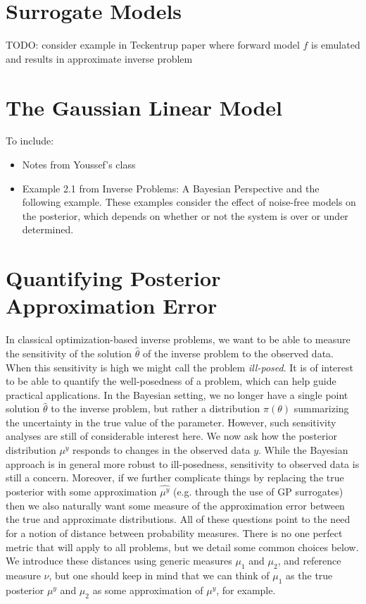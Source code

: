 \documentclass[12pt]{article}
\begin{document}
\section{Surrogate Models}
TODO: consider example in Teckentrup paper where forward model $f$ is emulated and results in approximate inverse problem 

\section{The Gaussian Linear Model}
To include: 
\begin{itemize}
\item Notes from Youssef's class
\item Example 2.1 from Inverse Problems: A Bayesian Perspective and the following example. These examples consider the effect of noise-free models on the posterior, which depends on whether or not the system is over or under determined. 
\end{itemize}



\section{Quantifying Posterior Approximation Error}
In classical optimization-based inverse problems, we want to be able to measure the sensitivity of the solution $\hat{\theta}$ of the inverse problem to the observed data. When this sensitivity is high we might call the 
problem \textit{ill-posed}. It is of interest to be able to quantify the well-posedness of a problem, which can help guide practical applications. In the Bayesian setting, we no longer have a single point solution 
$\hat{\theta}$ to the inverse problem, but rather a distribution $\pi(\theta)$ summarizing the uncertainty in the true value of the parameter. However, such sensitivity analyses are still of considerable interest here. We now 
ask how the posterior distribution $\mu^y$ responds to changes in the observed data $y$. While the Bayesian approach is in general more robust to ill-posedness, sensitivity to observed data is still a concern. Moreover, if we further complicate things by replacing the true posterior with some approximation $\hat{\mu^y}$ (e.g. through the use of GP surrogates) then we also naturally want some measure of the approximation error between the true and approximate distributions. All of these questions point to the need for a notion of distance between probability measures. There is no one perfect metric that will apply to all problems, but we detail some common choices below. We introduce these distances using generic measures $\mu_1$ and $\mu_2$, and reference measure $\nu$, but one should keep in mind that we can think of $\mu_1$ as the true posterior 
$\mu^y$ and $\mu_2$ as some approximation of $\mu^y$, for example.  
\end{document}
